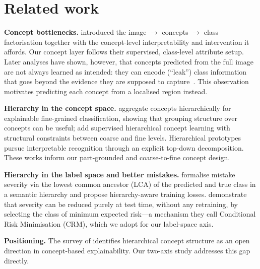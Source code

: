 \section{Related work}
\textbf{Concept bottlenecks.} \citet{koh2020concept} introduced the
image $\to$ concepts $\to$ class factorisation together with the
concept-level interpretability and intervention it affords. Our concept layer
follows their supervised, class-level attribute setup. Later analyses have shown,
however, that concepts predicted from the full image are not always learned as
intended: they can encode (``leak'') class information that goes beyond the
evidence they are supposed to capture~\cite{margeloiu2021concept}. This
observation motivates predicting each concept from a localised region instead.

\textbf{Hierarchy in the concept space.}
\citet{pittino2023hierarchical} aggregate concepts hierarchically for
explainable fine-grained classification, showing that grouping structure over
concepts can be useful; \citet{sun2024boosting} add supervised hierarchical
concept learning with structural constraints between coarse and fine levels.
Hierarchical prototypes~\cite{hase2019interpretable} pursue interpretable
recognition through an explicit top-down decomposition. These works inform our
part-grounded and coarse-to-fine concept design.

\textbf{Hierarchy in the label space and better mistakes.}
\citet{bertinetto2020making} formalise mistake severity via the lowest common
ancestor (LCA) of the predicted and true class in a semantic hierarchy and
propose hierarchy-aware training losses. \citet{karthik2021nocost} demonstrate that severity can be
reduced purely at test time, without any retraining, by selecting the class of
minimum expected risk---a mechanism they call Conditional Risk Minimisation
(CRM), which we adopt for our label-space axis.

\textbf{Positioning.} The survey of \citet{poeta2025concept} identifies
hierarchical concept structure as an open direction in concept-based
explainability. Our two-axis study addresses this gap directly.
